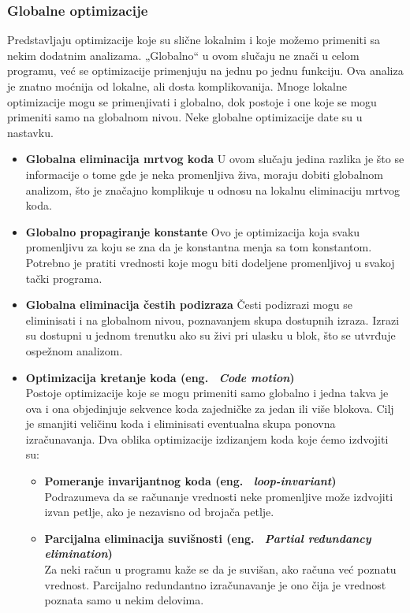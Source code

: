 \documentclass[a4paper]{article}
\begin{document}
\subsubsection{Globalne optimizacije}
\label{subsubsec:globalne}
Predstavljaju optimizacije koje su slične lokalnim i koje možemo primeniti sa nekim dodatnim analizama.
„Globalno“ u ovom slučaju ne znači u celom programu, već se optimizacije primenjuju na jednu po jednu fu\-nkciju. 
Ova analiza je znatno moćnija od lokalne, ali dosta komplikovanija. 
Mnoge lokalne optimizacije mogu se primenjivati i globalno, dok postoje i one koje se mogu primeniti samo na globalnom nivou.
Neke globalne optimizacije date su u nastavku.

\begin{itemize}
  \item \textbf{Globalna eliminacija mrtvog koda} \newline
  U ovom slučaju jedina razlika je što se informacije o tome gde je neka promenljiva živa, moraju dobiti globalnom analizom, što je značajno komplikuje u odnosu na lokalnu eliminaciju mrtvog koda.
  \item \textbf{Globalno propagiranje konstante} \newline
  Ovo je optimizacija koja svaku promenljivu za koju se zna da je konstantna menja sa tom konstantom.
  Potrebno je pratiti vrednosti koje mogu biti dodeljene promenljivoj u svakoj tački programa. 
  \item \textbf{Globalna eliminacija čestih podizraza} \newline
  Česti podizrazi mogu se eliminisati  i na globalnom nivou, poznavanjem skupa dostupnih izraza.
  Izrazi su dostupni u jednom trenutku ako su živi pri ulasku u blok, što se utvrđuje ospežnom analizom.
  \item \textbf{Optimizacija kretanje koda (eng. ~{\em Code motion})} \\
  Postoje optimizacije koje se mogu primeniti samo globalno i jedna takva je ova i ona objedinjuje sekvence koda zajedničke za jedan ili više blokova. 
  Cilj je smanjiti veličinu koda i eliminisati eventualna skupa ponovna izračunavanja. 
  Dva oblika optimizacije izdizanjem koda koje ćemo izdvojiti su:
  \begin{itemize}
    \item \textbf{Pomeranje invarijantnog koda (eng. ~{\em loop-invariant})} \\
       Podrazumeva da se računanje vrednosti neke promenljive može izdvojiti izvan petlje, ako je nezavisno od brojača petlje.
    \item \textbf{Parcijalna eliminacija suvišnosti (eng. ~{\em Partial redundancy elimination})} \\
    Za neki račun u programu kaže se da je suvišan, ako računa već poznatu vrednost. 
    Parcijalno redundantno izračunavanje  je ono čija je vrednost poznata samo u nekim delovima. \cite{stanford}
    
  \end{itemize}
\end{itemize}
\end{document}

